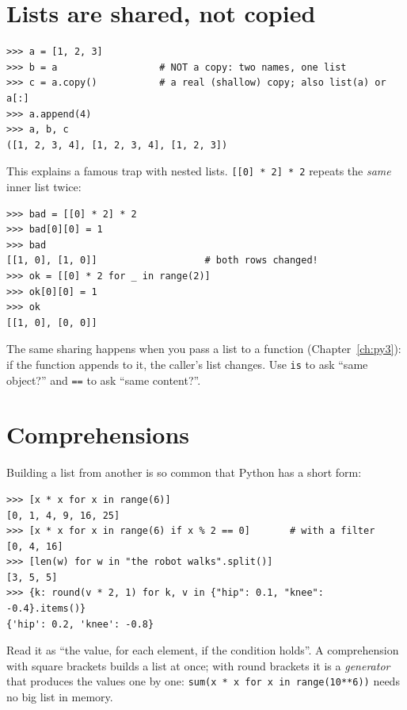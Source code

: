 \section*{Lists are shared, not copied}
\begin{verbatim}
>>> a = [1, 2, 3]
>>> b = a                  # NOT a copy: two names, one list
>>> c = a.copy()           # a real (shallow) copy; also list(a) or a[:]
>>> a.append(4)
>>> a, b, c
([1, 2, 3, 4], [1, 2, 3, 4], [1, 2, 3])
\end{verbatim}
\begin{center}
\label{fig:py4_alias}
\end{center}
This explains a famous trap with nested lists. \verb![[0] * 2] * 2! repeats the \emph{same} inner list twice:
\begin{verbatim}
>>> bad = [[0] * 2] * 2
>>> bad[0][0] = 1
>>> bad
[[1, 0], [1, 0]]                   # both rows changed!
>>> ok = [[0] * 2 for _ in range(2)]
>>> ok[0][0] = 1
>>> ok
[[1, 0], [0, 0]]
\end{verbatim}
The same sharing happens when you pass a list to a function (Chapter~\ref{ch:py3}): if the function appends to it, the caller's list changes. Use \texttt{is} to ask ``same object?'' and \texttt{==} to ask ``same content?''.

\section*{Comprehensions}
Building a list from another is so common that Python has a short form:
\begin{verbatim}
>>> [x * x for x in range(6)]
[0, 1, 4, 9, 16, 25]
>>> [x * x for x in range(6) if x % 2 == 0]       # with a filter
[0, 4, 16]
>>> [len(w) for w in "the robot walks".split()]
[3, 5, 5]
>>> {k: round(v * 2, 1) for k, v in {"hip": 0.1, "knee": -0.4}.items()}
{'hip': 0.2, 'knee': -0.8}
\end{verbatim}
Read it as ``the value, for each element, if the condition holds''. A comprehension with square brackets builds a list at once; with round brackets it is a \emph{generator} that produces the values one by one: \verb!sum(x * x for x in range(10**6))! needs no big list in memory.

